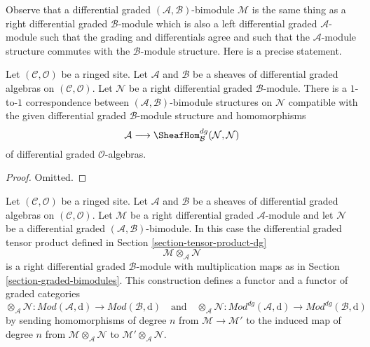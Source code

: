 \medskip\noindent
Observe that a differential graded $(\mathcal{A}, \mathcal{B})$-bimodule
$\mathcal{M}$ is the same thing as a right differential graded
$\mathcal{B}$-module which is also a left differential graded
$\mathcal{A}$-module such that the grading and differentials agree
and such that the $\mathcal{A}$-module structure commutes with
the $\mathcal{B}$-module structure. Here is a precise statement.

\begin{lemma}
\label{lemma-what-makes-a-bimodule-dg}
Let $(\mathcal{C}, \mathcal{O})$ be a ringed site. Let $\mathcal{A}$
and $\mathcal{B}$ be a sheaves of differential graded algebras on
$(\mathcal{C}, \mathcal{O})$. Let $\mathcal{N}$ be a right differential
graded $\mathcal{B}$-module. There is a $1$-to-$1$ correspondence
between $(\mathcal{A}, \mathcal{B})$-bimodule structures on
$\mathcal{N}$ compatible with the given
differential graded $\mathcal{B}$-module structure and homomorphisms
$$
\mathcal{A}
\longrightarrow
\SheafHom^{dg}_\mathcal{B}(\mathcal{N}, \mathcal{N})
$$
of differential graded $\mathcal{O}$-algebras.
\end{lemma}

\begin{proof}
Omitted.
\end{proof}

\noindent
Let $(\mathcal{C}, \mathcal{O})$ be a ringed site. Let $\mathcal{A}$
and $\mathcal{B}$ be a sheaves of differential graded algebras on
$(\mathcal{C}, \mathcal{O})$. Let $\mathcal{M}$ be a right
differential graded $\mathcal{A}$-module and let $\mathcal{N}$ be a
differential graded $(\mathcal{A}, \mathcal{B})$-bimodule. In this case the
differential graded tensor product defined in
Section \ref{section-tensor-product-dg}
$$
\mathcal{M} \otimes_\mathcal{A} \mathcal{N}
$$
is a right differential graded $\mathcal{B}$-module with
multiplication maps as in Section \ref{section-graded-bimodules}.
This construction defines a functor and a functor of graded categories
$$
\otimes_\mathcal{A} \mathcal{N} :
\textit{Mod}(\mathcal{A}, \text{d})
\longrightarrow
\textit{Mod}(\mathcal{B}, \text{d})
\quad\text{and}\quad
\otimes_\mathcal{A} \mathcal{N} :
\textit{Mod}^{dg}(\mathcal{A}, \text{d})
\longrightarrow
\textit{Mod}^{dg}(\mathcal{B}, \text{d})
$$
by sending homomorphisms of degree $n$ from $\mathcal{M} \to \mathcal{M}'$
to the induced map of degree $n$ from
$\mathcal{M} \otimes_\mathcal{A} \mathcal{N}$ to
$\mathcal{M}' \otimes_\mathcal{A} \mathcal{N}$.

